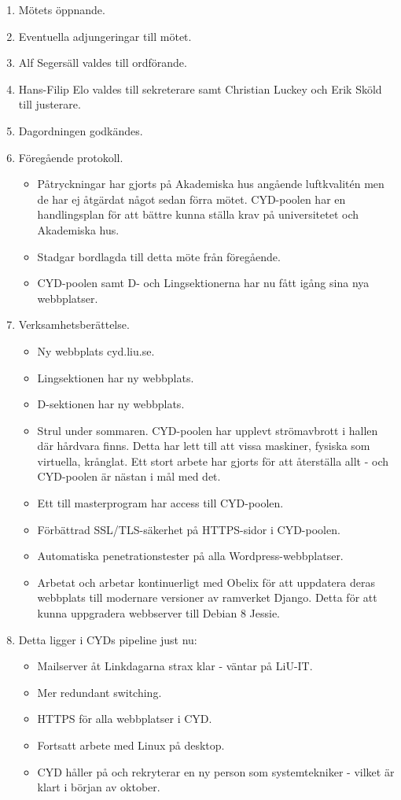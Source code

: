 \documentclass[a4paper,12pt]{article}
\begin{document}
\begin{enumerate}
\item Mötets öppnande.
\item Eventuella adjungeringar till mötet.
\item Alf Segersäll valdes till ordförande.
\item Hans-Filip Elo valdes till sekreterare samt Christian Luckey och Erik Sköld till justerare.
\item Dagordningen godkändes.
\item Föregående protokoll.
  \begin{itemize}
  \item Påtryckningar har gjorts på Akademiska hus angående luftkvalitén men de har ej åtgärdat något sedan förra mötet. CYD-poolen har en handlingsplan för att bättre kunna ställa krav på universitetet och Akademiska hus.
  \item Stadgar bordlagda till detta möte från föregående.
  \item CYD-poolen samt D- och Lingsektionerna har nu fått igång sina nya webbplatser.
  \end{itemize}
\item Verksamhetsberättelse.
  \begin{itemize}
    \item Ny webbplats cyd.liu.se.
    \item Lingsektionen har ny webbplats.
    \item D-sektionen har ny webbplats.
    \item Strul under sommaren. CYD-poolen har upplevt strömavbrott i hallen där hårdvara finns. Detta har lett till att vissa maskiner, fysiska som virtuella, krånglat. Ett stort arbete har gjorts för att återställa allt - och CYD-poolen är nästan i mål med det.
    \item Ett till masterprogram har access till CYD-poolen.
    \item Förbättrad SSL/TLS-säkerhet på HTTPS-sidor i CYD-poolen.
    \item Automatiska penetrationstester på alla Wordpress-webbplatser.
    \item Arbetat och arbetar kontinuerligt med Obelix för att uppdatera deras webbplats till modernare versioner av ramverket Django. Detta för att kunna uppgradera webbserver till Debian 8 Jessie.
  \end{itemize}
\item Detta ligger i CYDs pipeline just nu:
  \begin{itemize}
    \item Mailserver åt Linkdagarna strax klar - väntar på LiU-IT.
    \item Mer redundant switching.
    \item HTTPS för alla webbplatser i CYD.
    \item Fortsatt arbete med Linux på desktop.
    \item CYD håller på och rekryterar en ny person som systemtekniker - vilket är klart i början av oktober.
  \end{itemize}


\end{enumerate}
\end{document}
